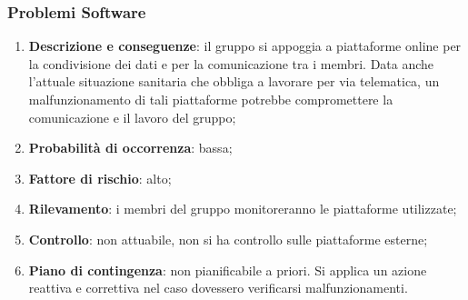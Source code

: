 	\subsubsection{Problemi Software}
	\begin{enumerate}
		\item \textbf{Descrizione e conseguenze}: il gruppo si appoggia a piattaforme online per la condivisione dei dati e per la comunicazione tra i membri. Data anche l'attuale situazione sanitaria che obbliga a lavorare per via telematica, un malfunzionamento di tali piattaforme potrebbe compromettere la comunicazione e il lavoro del gruppo;
		\item \textbf{Probabilità di occorrenza}: bassa;
		\item \textbf{Fattore di rischio}: alto;
		\item \textbf{Rilevamento}: i membri del gruppo monitoreranno le piattaforme utilizzate;
		\item \textbf{Controllo}: non attuabile, non si ha controllo sulle piattaforme esterne; 
		\item \textbf{Piano di contingenza}: non pianificabile a priori. Si applica un azione reattiva e correttiva nel caso dovessero verificarsi malfunzionamenti.
	\end{enumerate}		
